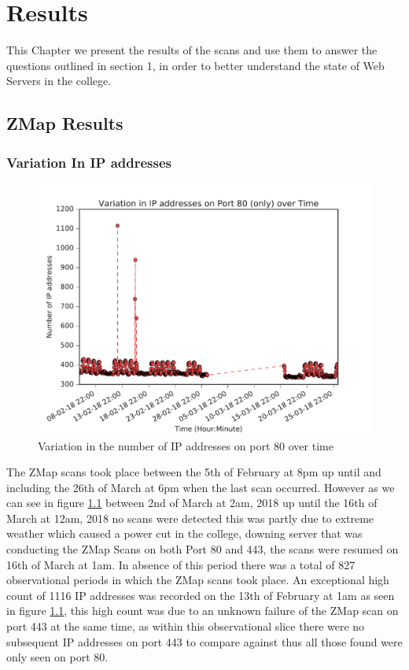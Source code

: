 \documentclass[a4wide,leqno,12pt]{report}
\begin{document}
\chapter{Results}

This Chapter we present the results of the scans and use them to answer the questions outlined in section 1, in order to better understand the state of Web Servers in the college.


\section{ZMap Results}

\subsection{Variation In IP addresses}
\begin{figure}[H]
\centering
\includegraphics[scale=.5]{pdf_images/VariationInIpAddressesOnPort80OverTime}
\caption{Variation in the number of IP addresses on port 80 over time}
\label{fig:port80ZMap}
\end{figure}

The ZMap scans took place between the 5th of February at 8pm up until and including the 26th of March at 6pm when the last scan occurred. However as we can see in figure \ref{fig:port80ZMap} between
2nd of March at 2am, 2018  up until the 16th of March at 12am, 2018 no scans were detected this was partly due to extreme weather which caused a power cut in the college, downing server that was conducting the ZMap Scans on both Port 80 and 443, the scans were resumed on 16th of March at 1am. In absence of this period there was a total of 827 observational periods in which the ZMap scans took place. An exceptional high count of 1116 IP addresses was recorded on the 13th of February at 1am as seen in figure \ref{fig:port80ZMap}, this high count was due to an unknown failure of the ZMap scan on port 443 at the same time, as within this observational slice there were no subsequent IP addresses on port 443 to compare against thus all those found were only seen on port 80.
\end{document}
